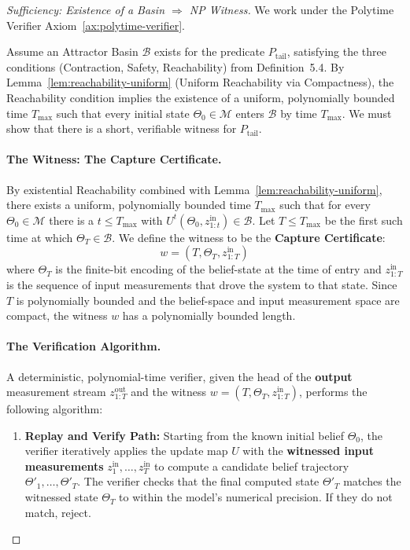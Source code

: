 \documentclass[12pt]{article}
\theoremstyle{definition}
\theoremstyle{plain}
\begin{document}
\begin{proof}[Sufficiency: Existence of a Basin $\Rightarrow$ NP Witness]
We work under the Polytime Verifier Axiom~\ref{ax:polytime-verifier}.

Assume an Attractor Basin $\mathcal{B}$ exists for the predicate $P_{\text{tail}}$, satisfying the three conditions (Contraction, Safety, Reachability) from Definition 5.4. By Lemma~\ref{lem:reachability-uniform} (Uniform Reachability via Compactness), the Reachability condition implies the existence of a uniform, polynomially bounded time $T_{\max}$ such that every initial state $\Theta_0\in\mathcal M$ enters $\mathcal B$ by time $T_{\max}$. We must show that there is a short, verifiable witness for $P_{\text{tail}}$.

\paragraph{The Witness: The Capture Certificate.}
By existential Reachability combined with Lemma~\ref{lem:reachability-uniform}, there exists a uniform, polynomially bounded time $T_{\max}$ such that for every $\Theta_0\in\mathcal M$ there is a $t\le T_{\max}$ with $U^t(\Theta_0,z^{\text{in}}_{1:t})\in\mathcal B$. Let $T\le T_{\max}$ be the first such time at which $\Theta_T\in\mathcal B$. We define the witness to be the \textbf{Capture Certificate}:
\[
w = (T, \Theta_T, z^{\text{in}}_{1:T})
\]
where $\Theta_T$ is the finite-bit encoding of the belief-state at the time of entry and $z^{\text{in}}_{1:T}$ is the sequence of input measurements that drove the system to that state. Since $T$ is polynomially bounded and the belief-space and input measurement space are compact, the witness $w$ has a polynomially bounded length.

\paragraph{The Verification Algorithm.}
A deterministic, polynomial-time verifier, given the head of the \textbf{output} measurement stream $z^{\text{out}}_{1:T}$ and the witness $w=(T, \Theta_T, z^{\text{in}}_{1:T})$, performs the following algorithm:
\begin{enumerate}
    \item \textbf{Replay and Verify Path:} Starting from the known initial belief $\Theta_0$, the verifier iteratively applies the update map $U$ with the \textbf{witnessed input measurements} $z^{\text{in}}_1, \dots, z^{\text{in}}_T$ to compute a candidate belief trajectory $\Theta'_1, \dots, \Theta'_T$. The verifier checks that the final computed state $\Theta'_T$ matches the witnessed state $\Theta_T$ to within the model's numerical precision. If they do not match, reject.


\end{enumerate}
\end{proof}
\end{document}
